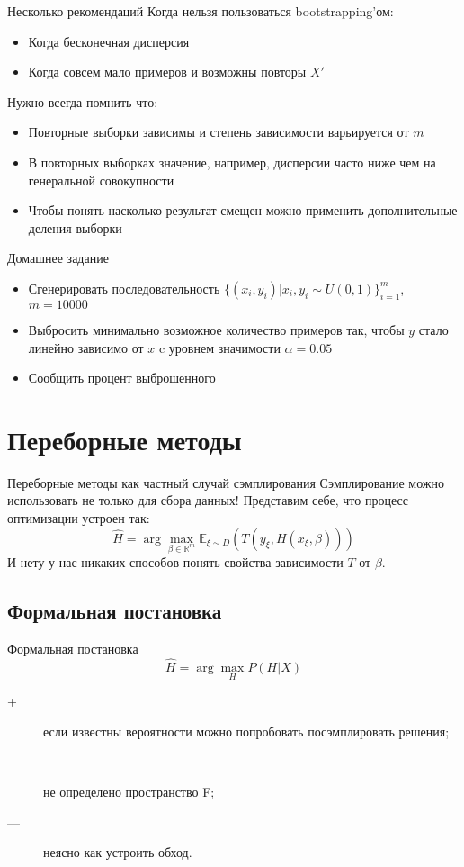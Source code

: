 \documentclass[14pt, fleqn, xcolor={dvipsnames, table}]{beamer}
\begin{document}
\begin{frame}{Несколько рекомендаций}
Когда нельзя пользоваться bootstrapping'ом:\small
\begin{itemize}
  \item Когда бесконечная дисперсия
  \item Когда совсем мало примеров и возможны повторы $X'$
\end{itemize}
\normalsize
Нужно всегда помнить что:\small
\begin{itemize}
  \item Повторные выборки зависимы и степень зависимости варьируется от $m$
  \item В повторных выборках значение, например, дисперсии часто ниже чем на генеральной совокупности
  \item Чтобы понять насколько результат смещен можно применить дополнительные деления выборки
\end{itemize}
\end{frame}

\begin{frame}{Домашнее задание}
\begin{itemize}
  \item Сгенерировать последовательность $\{(x_i, y_i)| x_i, y_i \sim U(0,1)\}_{i=1}^m$, $m=10000$
  \item Выбросить минимально возможное количество примеров так, чтобы $y$ стало линейно зависимо от $x$ c уровнем значимости $\alpha=0.05$
  \item Сообщить процент выброшенного
\end{itemize}
\end{frame}

\section{Переборные методы}

\begin{frame}{Переборные методы как частный случай сэмплирования}
Сэмплирование можно использовать не только для сбора данных! Представим себе, что процесс оптимизации устроен так:
$$
\hat{H} = \arg \max_{\beta \in \mathbb{R}^m} \mathbb{E}_{\xi \sim D}(T(y_{\xi}, H(x_{\xi}, \beta)))
$$
И нету у нас никаких способов понять свойства зависимости $T$ от $\beta$.
\end{frame}

\subsection{Формальная постановка}
\begin{frame}{Формальная постановка}
$$
\hat{H} = \arg\max_H P(H|X)
$$
\begin{description}
  \item[\color{green}+] если известны вероятности можно попробовать посэмплировать решения;
  \item[\color{red}---] не определено пространство F;
  \item[\color{red}---] неясно как устроить обход.
\end{description}
\end{frame}
\end{document}

